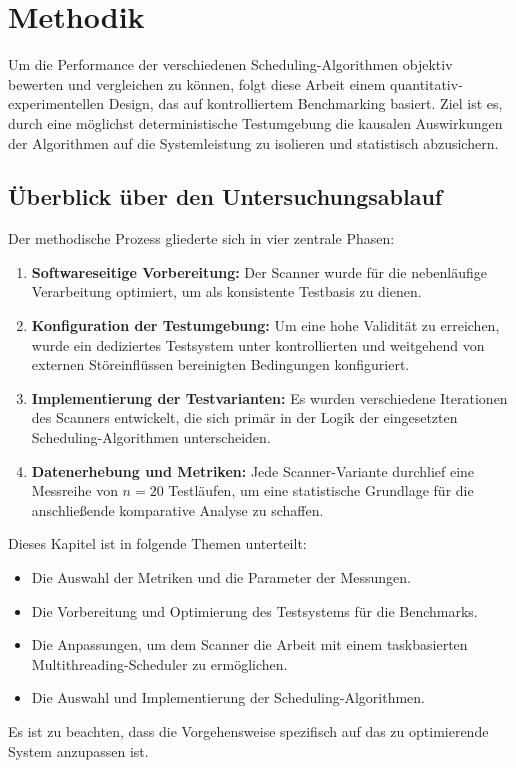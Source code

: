 \chapter{Methodik}
\label{ch:chapter03}

\begin{sloppypar}

Um die Performance der verschiedenen Scheduling-Algorithmen objektiv bewerten und vergleichen zu können, 
folgt diese Arbeit einem quantitativ-experimentellen Design, 
das auf kontrolliertem Benchmarking basiert. 
Ziel ist es, durch eine möglichst deterministische Testumgebung
die kausalen Auswirkungen der Algorithmen auf die Systemleistung zu isolieren und statistisch abzusichern.

\section{Überblick über den Untersuchungsablauf}
Der methodische Prozess gliederte sich in vier zentrale Phasen:
\begin{enumerate}
    \item \textbf{Softwareseitige Vorbereitung:} Der Scanner wurde für die nebenläufige Verarbeitung optimiert, um als konsistente Testbasis zu dienen.
    \item \textbf{Konfiguration der Testumgebung:} Um eine hohe Validität zu erreichen, 
    wurde ein dediziertes Testsystem unter kontrollierten und weitgehend von externen Störeinflüssen bereinigten Bedingungen konfiguriert.
    \item \textbf{Implementierung der Testvarianten:} Es wurden verschiedene Iterationen des Scanners entwickelt, 
    die sich primär in der Logik der eingesetzten Scheduling-Algorithmen unterscheiden.
    \item \textbf{Datenerhebung und Metriken:} Jede Scanner-Variante durchlief eine Messreihe von $n=20$ Testläufen, 
    um eine statistische Grundlage für die anschließende komparative Analyse zu schaffen.
\end{enumerate}

\vspace{7.56mm}

\noindent Dieses Kapitel ist in folgende Themen unterteilt:
\begin{itemize}
    \item Die Auswahl der Metriken und die Parameter der Messungen.
    \item Die Vorbereitung und Optimierung des Testsystems für die Benchmarks.
    \item Die Anpassungen, um dem Scanner die Arbeit mit einem taskbasierten Multithreading-Scheduler zu ermöglichen.
    \item Die Auswahl und Implementierung der Scheduling-Algorithmen.
\end{itemize}
Es ist zu beachten, dass die Vorgehensweise spezifisch auf das zu optimierende System anzupassen ist.


\end{sloppypar}
